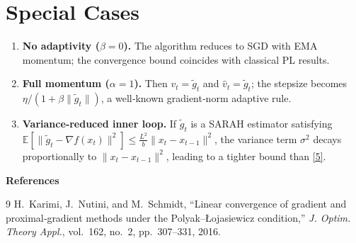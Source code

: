 \documentclass{article}
\begin{document}
\section*{Special Cases}
\begin{enumerate}
\item \textbf{No adaptivity ($\beta=0$).} The algorithm reduces to SGD with EMA momentum; the convergence bound coincides with classical PL results.
\item \textbf{Full momentum ($\alpha=1$).} Then $v_t=\tilde g_t$ and $\hat v_t=\tilde g_t$; the stepsize becomes $\eta/(1+\beta\|\tilde g_t\|)$, a well‑known gradient‑norm adaptive rule.
\item \textbf{Variance‑reduced inner loop.} If $\tilde g_t$ is a SARAH estimator satisfying $\mathbb{E}[\|\tilde g_t-\nabla f(x_t)\|^{2}]\le\frac{L^{2}}{b}\|x_t-x_{t-1}\|^{2}$, the variance term $\sigma^{2}$ decays proportionally to $\|x_t-x_{t-1}\|^{2}$, leading to a tighter bound than \eqref{5}.
\end{enumerate}

\bigskip
\noindent\textbf{References}\\
\begin{thebibliography}{9}
H.~Karimi, J.~Nutini, and M.~Schmidt,
``Linear convergence of gradient and proximal‑gradient methods under the
Polyak–Łojasiewicz condition,''
\emph{J. Optim. Theory Appl.}, vol.~162, no.~2, pp.~307–331, 2016.
\end{thebibliography}
\end{document}
